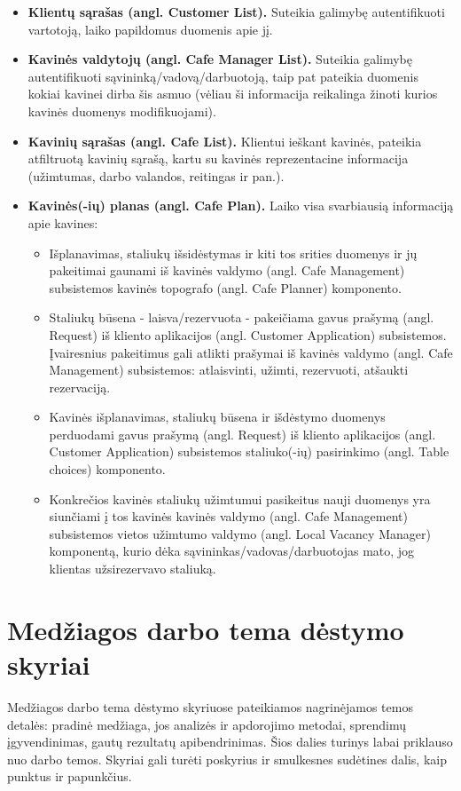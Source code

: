 \documentclass{VUMIFPSkursinis}
\begin{document}
\begin{itemize}
  \item \textbf{Klientų sąrašas (angl. Customer List).} Suteikia galimybę autentifikuoti vartotoją, laiko papildomus duomenis apie jį.
  \item \textbf{Kavinės valdytojų (angl. Cafe Manager List).} Suteikia galimybę autentifikuoti sąvininką/vadovą/darbuotoją, taip pat pateikia duomenis kokiai kavinei dirba šis asmuo (vėliau ši informacija reikalinga žinoti kurios kavinės duomenys modifikuojami).
  \item \textbf{Kavinių sąrašas (angl. Cafe List).} Klientui ieškant kavinės, pateikia atfiltruotą kavinių sąrašą, kartu su kavinės reprezentacine informacija (užimtumas, darbo valandos, reitingas ir pan.).
  \item \textbf{Kavinės(-ių) planas (angl. Cafe Plan).} Laiko visa svarbiausią informaciją apie kavines:
  	\begin{itemize}
  	\item Išplanavimas, staliukų išsidėstymas ir kiti tos srities duomenys ir jų pakeitimai gaunami iš kavinės valdymo (angl. Cafe Management) subsistemos kavinės topografo (angl. Cafe Planner) komponento.
  	\item Staliukų būsena - laisva/rezervuota - pakeičiama gavus prašymą (angl. Request) iš kliento aplikacijos (angl. Customer Application) subsistemos. Įvairesnius pakeitimus gali atlikti prašymai iš kavinės valdymo (angl. Cafe Management) subsistemos: atlaisvinti, užimti, rezervuoti, atšaukti rezervaciją.
  	\item Kavinės išplanavimas, staliukų būsena ir išdėstymo duomenys perduodami gavus prašymą (angl. Request) iš kliento aplikacijos (angl. Customer Application) subsistemos staliuko(-ių) pasirinkimo (angl. Table choices) komponento.
  	\item Konkrečios kavinės staliukų užimtumui pasikeitus nauji duomenys yra siunčiami į tos kavinės kavinės valdymo (angl. Cafe Management) subsistemos vietos užimtumo valdymo (angl. Local Vacancy Manager) komponentą, kurio dėka sąvininkas/vadovas/darbuotojas mato, jog klientas užsirezervavo staliuką.
  	\end{itemize}
\end{itemize}


\section{Medžiagos darbo tema dėstymo skyriai}
Medžiagos darbo tema dėstymo skyriuose pateikiamos nagrinėjamos temos detalės:
pradinė medžiaga, jos analizės ir apdorojimo metodai, sprendimų įgyvendinimas,
gautų rezultatų apibendrinimas. Šios dalies turinys labai priklauso nuo darbo
temos. Skyriai gali turėti poskyrius ir smulkesnes sudėtines dalis, kaip
punktus ir papunkčius.
\end{document}
